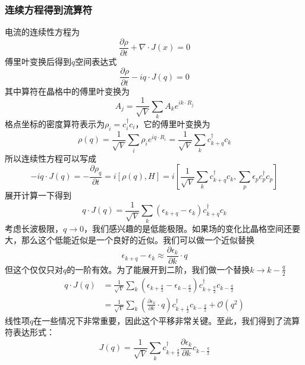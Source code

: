 \documentclass{article}
\numberwithin{equation}{subsection}
\begin{document}
\subsubsection{连续方程得到流算符}
电流的连续性方程为
\begin{equation}
    \frac{\partial\rho}{\partial t}+\nabla\cdot J(x)=0
\end{equation}
傅里叶变换后得到$q$空间表达式
\begin{equation}
    \frac{\partial\rho}{\partial t}-iq\cdot J(q)=0
\end{equation}
其中算符在晶格中的傅里叶变换为
\begin{equation}
    A_j=\frac{1}{\sqrt{V}}\sum_{k}A_ke^{ik\cdot R_j}
\end{equation}
格点坐标的密度算符表示为$\rho_i=c_i^\dagger c_i$，它的傅里叶变换为
\begin{equation}
    \rho(q)=\frac{1}{\sqrt{V}}\sum_i\rho_ie^{iq\cdot R_i}=\frac{1}{\sqrt{V}}\sum_{k}c_{k+q}^\dagger c_k
\end{equation}
所以连续性方程可以写成
\begin{equation}
    -iq\cdot J(q)=-\frac{\partial\rho_q}{\partial t}=i[\rho(q),H]=i[\frac{1}{\sqrt{V}}\sum_{k}c_{k+q}^\dagger c_k,\sum_p \epsilon_p c_p^\dagger c_p]
\end{equation}
展开计算一下得到
\begin{equation}
    q\cdot J(q)=\frac{1}{\sqrt{V}}\sum_{k}(\epsilon_{k+q}-\epsilon_k)c_{k+q}^\dagger c_k
\end{equation}
考虑长波极限，$q\to 0$，我们感兴趣的是低能极限。如果场的变化比晶格空间还要大，那么这个低能近似是一个良好的近似。我们可以做一个近似替换
\begin{equation}
    \epsilon_{k+q}-\epsilon_k\approx\frac{\partial\epsilon_k}{\partial k}\cdot q
\end{equation}
但这个仅仅只对$q$的一阶有效。为了能展开到二阶，我们做一个替换$k\rightarrow k-\frac{q}{2}$
\begin{equation}
    \begin{split}
        q\cdot J(q)&=\frac{1}{\sqrt{V}}\sum_k(\epsilon_{k+\frac{q}{2}}-\epsilon_{k-\frac{q}{2}})c_{k+\frac{q}{2}}^\dagger c_{k-\frac{q}{2}}\\
        &=\frac{1}{\sqrt{V}}\sum_k(\frac{\partial\epsilon_k}{\partial k}\cdot q)c_{k+\frac{1}{2}}^\dagger c_{k-\frac{q}{2}}+\mathcal{O}(q^2)
    \end{split}
\end{equation}
线性项$q$在一些情况下非常重要，因此这个平移非常关键。至此，我们得到了流算符表达形式：
\begin{equation}
    J(q)=\frac{1}{\sqrt{V}}\sum_{k}c_{k+\frac{q}{2}}^\dagger\frac{\partial\epsilon_k}{\partial k}c_{k-\frac{q}{2}}
\end{equation}
\end{document}
